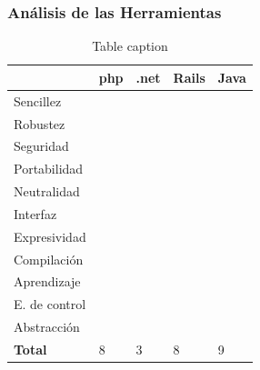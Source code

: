 \documentclass{beamer}
\newcommand{\cmark}{\ding{51}}%
\newcommand{\xmark}{\ding{55}}%
\begin{document}

\begin{frame}
\frametitle{Análisis de las Herramientas}
\begin{table}
\begin{tabular}{l l l l l}
\toprule
				& \textbf{php} & \textbf{.net} & \textbf{Rails} & \textbf{Java}\\
\midrule
Sencillez 		& \textcolor{green}{\cmark} & \textcolor{red}{\xmark}   & \textcolor{red}{\xmark}   &\textcolor{green}{\cmark}\\
Robustez 		& \textcolor{red}{\xmark}   & \textcolor{green}{\cmark} & \textcolor{green}{\cmark} &\textcolor{green}{\cmark}\\
Seguridad 		& \textcolor{red}{\xmark}   & \textcolor{red}{\xmark}   & \textcolor{green}{\cmark} &\textcolor{green}{\cmark}\\
Portabilidad 	& \textcolor{green}{\cmark} & \textcolor{red}{\xmark}   & \textcolor{red}{\xmark}   &\textcolor{green}{\cmark}\\
Neutralidad 	& \textcolor{green}{\cmark} & \textcolor{red}{\xmark}   & \textcolor{green}{\cmark} &\textcolor{green}{\cmark}\\
Interfaz 		& \textcolor{red}{\xmark}   & \textcolor{green}{\cmark} & \textcolor{green}{\cmark} &\textcolor{green}{\cmark}\\
Expresividad 	& \textcolor{green}{\cmark} & \textcolor{red}{\xmark}   & \textcolor{green}{\cmark} &\textcolor{red}{\xmark}\\
Compilación 	& \textcolor{green}{\cmark} & \textcolor{red}{\xmark}   & \textcolor{green}{\cmark} &\textcolor{red}{\xmark}\\
Aprendizaje 	& \textcolor{green}{\cmark} & \textcolor{red}{\xmark}   & \textcolor{green}{\cmark} &\textcolor{green}{\cmark}\\
E. de control 	& \textcolor{green}{\cmark} & \textcolor{green}{\cmark} & \textcolor{green}{\cmark} &\textcolor{green}{\cmark}\\
Abstracción 	& \textcolor{green}{\cmark} & \textcolor{red}{\xmark}   & \textcolor{red}{\xmark}   &\textcolor{green}{\cmark}\\
\textbf{Total}  & 8 & 3 & 8 & 9\\
\bottomrule
\end{tabular}
\caption{Table caption}
\end{table}
\end{frame}

\end{document}
